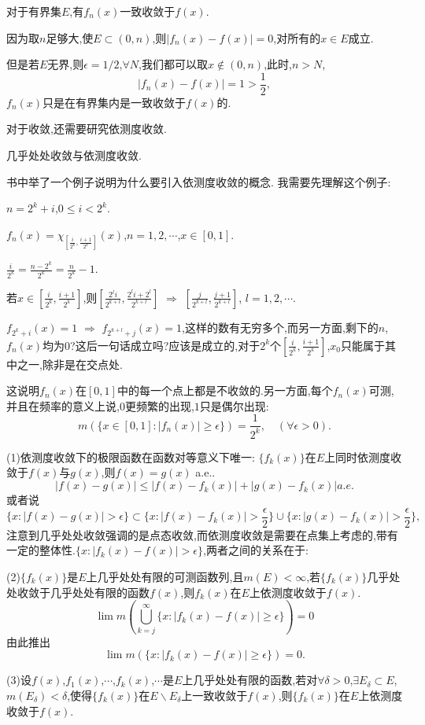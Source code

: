 \documentclass[12pt,a4paper,openany]{book}
\begin{document}
对于有界集$E$,有$f_n(x)$一致收敛于$f(x)$.

因为取$n$足够大,使$E\subset(0,n)$,则$|f_n(x)-f(x)|=0$,对所有的$x \in E$成立.

但是若$E$无界,则$\epsilon=1/2$,$\forall N$,我们都可以取$x\notin (0,n)$,此时,$n>N$,
\[
|f_n(x)-f(x)|=1>\frac{1}{2},
\]
$f_n(x)$只是在有界集内是一致收敛于$f(x)$的.

对于收敛,还需要研究依测度收敛.

几乎处处收敛与依测度收敛.

书中举了一个例子说明为什么要引入依测度收敛的概念. 我需要先理解这个例子:

$n=2^k + i$,$0 \le i < 2^k$.

$f_n(x) = \chi_{[\frac{i}{2^k}, \frac{i+1}{2^k}]}(x)$,$n=1,2,\cdots$,$x\in[0,1]$.

$\frac{i}{2^k}=\frac{n-2^k}{2^k}=\frac{n}{2^k}-1$.

若$x\in[\frac{i}{2^k}, \frac{i+1}{2^k}]$,则$[\frac{2^li}{2^{k+l}}, \frac{2^li+2^l}{2^{k+l}}]$ $\Rightarrow$ $[\frac{j}{2^{k+l}},\frac{j+1}{2^{k+l}}]$, $l=1,2,\cdots$.

$f_{2^k+i}(x) = 1$ $\Rightarrow$ $f_{2^{k+l}+j}(x)=1$,这样的数有无穷多个,而另一方面,剩下的$n$,$f_n(x)$均为0?这后一句话成立吗?应该是成立的,对于$2^k$个$[\frac{i}{2^k},\frac{i+1}{2^k}]$,$x_0$只能属于其中之一,除非是在交点处.

这说明$f_n(x)$在$[0,1]$中的每一个点上都是不收敛的.另一方面,每个$f_n(x)$可测,并且在频率的意义上说,$0$更频繁的出现,$1$只是偶尔出现:
\[
m(\{x \in [0,1]:|f_n(x)| \ge \epsilon\}) = \frac{1}{2^k}, \quad (\forall \epsilon > 0).
\]

(1)依测度收敛下的极限函数在函数对等意义下唯一:
$\{f_k(x)\}$在$E$上同时依测度收敛于$f(x)$与$g(x)$,则$f(x)=g(x)$ a.e..
\[
|f(x) - g(x)| \le |f(x)-f_k(x)| + |g(x)-f_k(x)| a.e.
\]
或者说
\[
\{x:|f(x)-g(x)|>\epsilon\} \subset \{x:|f(x)-f_k(x)|>\frac{\epsilon}{2}\} \cup \{x:|g(x)-f_k(x)|>\frac{\epsilon}{2}\},
\]
注意到几乎处处收敛强调的是点态收敛,而依测度收敛是需要在点集上考虑的,带有一定的整体性.$\{x:|f_k(x)-f(x)|>\epsilon\}$,两者之间的关系在于:

(2)$\{f_k(x)\}$是$E$上几乎处处有限的可测函数列,且$m(E)<\infty$,若$\{f_k(x)\}$几乎处处收敛于几乎处处有限的函数$f(x)$,则$f_k(x)$在$E$上依测度收敛于$f(x)$.
\[
\lim{m(\bigcup_{k=j}^{\infty}\{x: |f_k(x)-f(x)| \ge \epsilon\}) = 0}
\]
由此推出
\[
\lim{m(\{x: |f_k(x)-f(x)| \ge \epsilon\})} = 0.
\]

(3)设$f(x)$,$f_1(x)$,$\cdots$,$f_k(x)$,$\cdots$是$E$上几乎处处有限的函数,若对$\forall \delta>0$,$\exists E_{\delta} \subset E$,$m(E_{\delta})<\delta$,使得$\{f_k(x)\}$在$E\backslash E_{\delta}$上一致收敛于$f(x)$,则$\{f_k(x)\}$在$E$上依测度收敛于$f(x)$.
\end{document}
